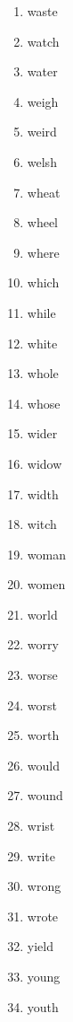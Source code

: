 \documentclass[10pt]{article}
\begin{document}
\begin{multicols}{9}
\begin{enumerate}[itemsep=1pt,parsep=0pt]
\item waste
\item watch
\item water
\item weigh
\item weird
\item welsh
\item wheat
\item wheel
\item where
\item which
\item while
\item white
\item whole
\item whose
\item wider
\item widow
\item width
\item witch
\item woman
\item women
\item world
\item worry
\item worse
\item worst
\item worth
\item would
\item wound
\item wrist
\item write
\item wrong
\item wrote
\item yield
\item young
\item youth
\end{enumerate}
\end{multicols} %
\end{document}
